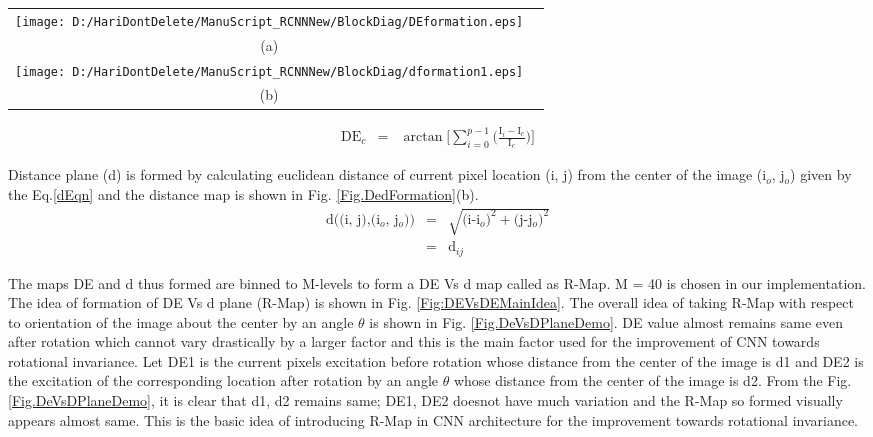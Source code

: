 \begin{figure*}
\begin{tabular}{cc}
\texttt{[image: D:/HariDontDelete/ManuScript\_RCNNNew/BlockDiag/DEformation.eps]}\\
(a) \\
\texttt{[image: D:/HariDontDelete/ManuScript\_RCNNNew/BlockDiag/dformation1.eps]}\\
(b) \\
\end{tabular}
\caption{ (a) Formation of differential excitation map considering the current pixel with respect to neighbours, (b) Formation of distance plane considering the current pixel location with respect to center of the image.}
\label{Fig.DedFormation}
\end{figure*}

\begin{eqnarray}
\text{DE$_c$} & = &\arctan \big[ \sum_{i=0}^{p-1}\big( \frac{\text{I}_i - \text{I}_c}{\text{I}_c}\big) \big] 
\label{DEEqn}
\end{eqnarray}

Distance plane (d) is formed by calculating euclidean distance of current pixel location (i, j) from the center of the image (i$_o$, j$_o$) given by the Eq.\ref{dEqn} and the distance map is shown in Fig. \ref{Fig.DedFormation}(b).\\

\begin{eqnarray}
\nonumber
\text{d((i, j),(i$_o$, j$_o$))} & = &\sqrt{\text{(i-i$_o$)}^2+\text{(j-j$_o$)}^2}\\ 
& = &\text{d$_{ij}$} 
\label{dEqn}
\end{eqnarray}


The maps DE and d thus formed are binned to M-levels to form a DE Vs d map called as R-Map. M = 40 is chosen in our implementation. The idea of formation of DE Vs d plane (R-Map) is shown in Fig. \ref{Fig:DEVsDEMainIdea}. The overall idea of taking R-Map with respect to orientation of the image about the center by an angle $\theta$ is shown in Fig. \ref{Fig.DeVsDPlaneDemo}. DE value almost remains same even after rotation which cannot vary drastically by a larger factor and this is the main factor used for the improvement of CNN towards rotational invariance. Let DE1 is the current pixels excitation before rotation whose distance from the center of the image is d1 and DE2 is the excitation of the corresponding location after rotation by an angle $\theta$ whose distance from the center of the image is d2. From the Fig. \ref{Fig.DeVsDPlaneDemo}, it is clear that d1, d2 remains same; DE1, DE2 doesnot have much variation and the R-Map so formed visually appears almost same. This is the basic idea of introducing R-Map in CNN architecture for the improvement towards rotational invariance. \\


